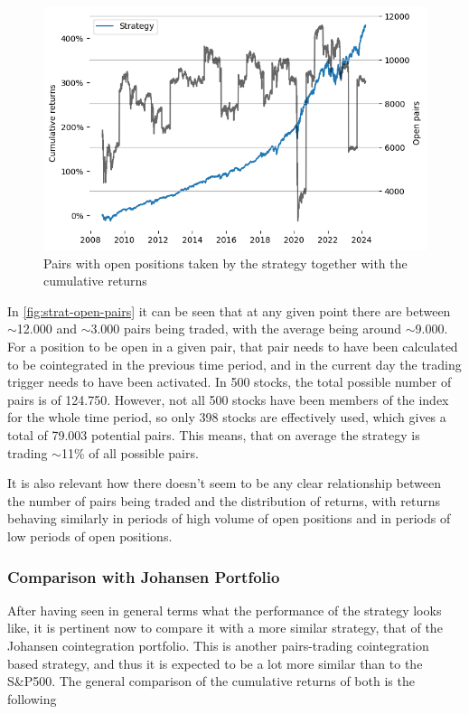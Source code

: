 \begin{figure}[ht]
    \includegraphics[width=\linewidth]{assets/strat-open-pairs.png}
    \caption{Pairs with open positions taken by the strategy together with the cumulative returns}
    \label{fig:strat-open-pairs}
\end{figure}

In \autoref{fig:strat-open-pairs} it can be seen that at any given point there are between $\sim$12.000 and $\sim$3.000 pairs being traded, with the average being around $\sim$9.000. For a position to be open in a given pair, that pair needs to have been calculated to be cointegrated in the previous time period, and in the current day the trading trigger needs to have been activated. In 500 stocks, the total possible number of pairs is of 124.750. However, not all 500 stocks have been members of the index for the whole time period, so only 398 stocks are effectively used, which gives a total of 79.003 potential pairs. This means, that on average the strategy is trading $\sim$11\% of all possible pairs. 

It is also relevant how there doesn't seem to be any clear relationship between the number of pairs being traded and the distribution of returns, with returns behaving similarly in periods of high volume of open positions and in periods of low periods of open positions. 

\subsubsection{Comparison with Johansen Portfolio}
After having seen in general terms what the performance of the strategy looks like, it is pertinent now to compare it with a more similar strategy, that of the Johansen cointegration portfolio. This is another pairs-trading cointegration based strategy, and thus it is expected to be a lot more similar than to the S\&P500. The general comparison of the cumulative returns of both is the following

